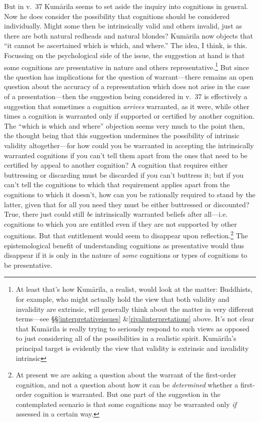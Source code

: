 ﻿\documentclass[11pt]{amsart}
\begin{document}
But in v.~37 Kum\=arila seems to set aside the inquiry into cognitions in general. Now he does consider the possibility that cognitions should be considered individually. Might some then be intrinsically valid and others invalid, just as there are both natural redheads and natural blondes? Kum\=arila now objects that ``it cannot be ascertained which is which, and where.'' The idea, I think, is this. Focussing on the psychological side of the issue, the suggestion at hand is that some cognitions are presentative in nature and others representative.\footnote{At least that's how Kum\=arila, a realist, would look at the matter: Buddhists, for example, who might actually hold the view that both validity and invalidity are extrinsic, will generally think about the matter in very different terms---see \S\S\ref{interpretativeissues} \&\ref{rivalinterpretations} above. It's not clear that Kum\=arila is really trying to seriously respond to such views as opposed to just considering all of the possibilities in a realistic spirit. Kum\=arila's principal target is evidently the view that validity is extrinsic and invalidity intrinsic} But since the question has implications for the question of warrant---there remains an open question about the accuracy of a representation which does not arise in the case of a presentation---then the suggestion being considered in v.~37 is effectively a suggestion that sometimes a cognition \emph{arrives} warranted, as it were, while other times a cognition is warranted only if supported or certified by another cognition. The ``which is which and where'' objection seems very much to the point then, the thought being that this suggestion undermines the possibility of intrinsic validity altogether---for how could you be warranted in accepting the intrinsically warranted cognitions if you can't tell them apart from the ones that need to be certified by appeal to another cognition? A cognition that requires either buttressing or discarding must be discarded if you can't buttress it; but if you can't tell the cognitions to which that requirement applies apart from the cognitions to which it doesn't, how can you be rationally required to stand by the latter, given that for all you need they must be either buttressed or discounted? True, there just could still \emph{be} intrinsically warranted beliefs after all---i.e. cognitions to which you are entitled even if they are not supported by other cognitions. But that entitlement would seem to disappear upon reflection.\footnote{At present we are asking a question about the warrant of the first-order cognition, and not a question about how it can be \emph{determined} whether a first-order cognition is warranted. But one part of the suggestion in the contemplated scenario is that some cognitions may be warranted only \emph{if} assessed in a certain way.} The epistemological benefit of understanding cognitions as presentative would thus disappear if it is only in the nature of \emph{some} cognitions or types of cognitions to be presentative.
\end{document}
